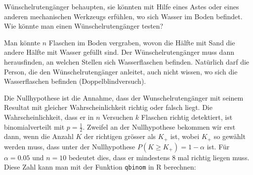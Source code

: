 Wünschelrutengänger behaupten, sie könnten mit Hilfe eines Astes
oder eines anderen mechanischen Werkzeugs erfühlen, wo sich Wasser
im Boden befindet. Wie könnte man einen Wünschelrutengänger testen?


\begin{loesung}
Man könnte $n$ Flaschen im Boden vergraben, wovon die Hälfte
mit Sand die andere Hälfte mit Wasser gefüllt sind.
Der Wünschelrutengänger muss dann herausfinden, an welchen Stellen
sich Wasserflaschen befinden.
Natürlich darf die Person, die den
Wünschelrutengänger anleitet, auch nicht wissen, wo sich die
Wasserflaschen befinden (Doppelblindversuch).

Die Nullhypothese ist die Annahme, dass der Wunschelrutengänger mit
seinem Resultat mit
gleicher Wahrscheinlichkeit richtig oder falsch liegt.
Die Wahrscheinlichkeit, dass er  in $n$ Versuchen
$k$ Flaschen richtig detektiert, ist
binomialverteilt mit $p=\frac12$.
Zweifel an der Nullhypothese bekommen wir erst
dann, wenn die Anzahl $K$ der richtigen grösser als $K_+$ ist, wobei
$K_+$ so gewählt werden muss, dass unter der Nullhypothese
$P(K\ge K_+)=1-\alpha$ ist. Für $\alpha=0.05$ und $n=10$ bedeutet
dies, dass er mindestens 8 mal richtig liegen muss. Diese Zahl
kann man mit der Funktion {\tt qbinom} in R berechnen:
\end{loesung}

